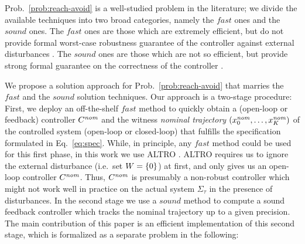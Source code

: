 Prob.~\ref{prob:reach-avoid} is a well-studied problem in the literature; we divide the available techniques into two broad categories, namely the $\mathit{fast}$ ones and the $\mathit{sound}$ ones.
The $\mathit{fast}$ ones are those which are extremely efficient, but do not provide formal worst-case robustness guarantee of the controller against external disturbances \cite{howell2019altro,choset2005principles}.
The $\mathit{sound}$ ones are those which are not so efficient, but provide strong formal guarantee on the correctness of the controller \cite{reissig2016feedback,fisac2015reach,tedrake2009lqr}.

We propose a solution approach for Prob.~\ref{prob:reach-avoid} that marries the $\mathit{fast}$ and the $\mathit{sound}$ solution techniques.
Our approach is a two-stage procedure: 
First, we deploy an off-the-shelf $\mathit{fast}$ method to quickly obtain a (open-loop or feedback) controller $C^{\mathit{nom}}$ and the witness \emph{nominal trajectory} $(x_0^{\mathit{nom}},\ldots,x_K^{\mathit{nom}})$ of the controlled system (open-loop or closed-loop) that fulfills the specification formulated in Eq.~\eqref{eq:spec}.
While, in principle, any $\mathit{fast}$ method could be used for this first phase, in this work we use ALTRO \cite{howell2019altro}.
ALTRO requires us to ignore the external disturbance (i.e.\ set $W=\{ 0 \}$) at first, and only gives us an open-loop controller $C^{\mathit{nom}}$.
Thus, $C^{\mathit{nom}}$ is presumably a non-robust controller which might not work well in practice on the actual system $\Sigma_\tau$ in the presence of disturbances.
In the second stage we use a $\mathit{sound}$ method to compute a sound feedback controller which tracks the nominal trajectory up to a given precision.
The main contribution of this paper is an efficient implementation of this second stage, which is formalized as a separate problem in the following:


